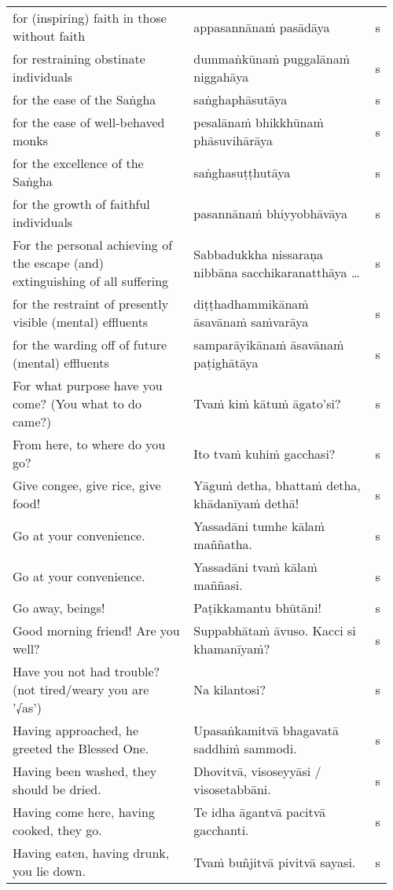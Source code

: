\documentclass[a5paper]{memoir}
\begin{document}
\begin{longtable}{L{0.48\linewidth} L{0.48\linewidth} H}
for (inspiring) faith in those without faith & appasannānaṁ pasādāya & s\\[0pt]
for restraining obstinate individuals & dummaṅkūnaṁ puggalānaṁ niggahāya & s\\[0pt]
for the ease of the Saṅgha & saṅghaphāsutāya & s\\[0pt]
for the ease of well-behaved monks & pesalānaṁ bhikkhūnaṁ phāsuvihārāya & s\\[0pt]
for the excellence of the Saṅgha & saṅghasuṭṭhutāya & s\\[0pt]
for the growth of faithful individuals & pasannānaṁ bhiyyobhāvāya & s\\[0pt]
For the personal achieving of the escape (and) extinguishing of all suffering & Sabbadukkha nissaraṇa nibbāna sacchikaranatthāya \ldots{} & s\\[0pt]
for the restraint of presently visible (mental) effluents & diṭṭhadhammikānaṁ āsavānaṁ saṁvarāya & s\\[0pt]
for the warding off of future (mental) effluents & samparāyikānaṁ āsavānaṁ paṭighātāya & s\\[0pt]
For what purpose have you come? (You what to do came?) & Tvaṁ kiṁ kātuṁ āgato'si? & s\\[0pt]
From here, to where do you go? & Ito tvaṁ kuhiṁ gacchasi? & s\\[0pt]
Give congee, give rice, give food! & Yāguṁ detha, bhattaṁ detha, khādanīyaṁ dethā! & s\\[0pt]
Go at your convenience. & Yassadāni tumhe kālaṁ maññatha. & s\\[0pt]
Go at your convenience. & Yassadāni tvaṁ kālaṁ maññasi. & s\\[0pt]
Go away, beings! & Paṭikkamantu bhūtāni! & s\\[0pt]
Good morning friend! Are you well? & Suppabhātaṁ āvuso. Kacci si khamanīyaṁ? & s\\[0pt]
Have you not had trouble? (not tired/weary you are '√as') & Na kilantosi? & s\\[0pt]
Having approached, he greeted the Blessed One. & Upasaṅkamitvā bhagavatā saddhiṁ sammodi. & s\\[0pt]
Having been washed, they should be dried. & Dhovitvā, visoseyyāsi / visosetabbāni. & s\\[0pt]
Having come here, having cooked, they go. & Te idha āgantvā pacitvā gacchanti. & s\\[0pt]
Having eaten, having drunk, you lie down. & Tvaṁ buñjitvā pivitvā sayasi. & s\\[0pt]

\end{longtable}
\end{document}
